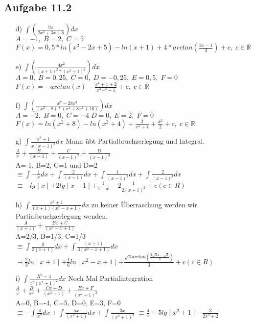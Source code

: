 \documentclass{standalone}
\begin{document}
\subsection{Aufgabe 11.2}
\begin{itemize}
	\item[d)]$\int \left(\frac{9x}{2x^3+3x+5}\right) dx$\\
	$A=-1, \; B=2, \; C=5$\\
	$F(x) =0,5*ln(x^2-2x+5)-ln(x+1)+4*arctan\left(\frac{2x-1}{3}\right)+c, \; c \in \mathbb{R}$
	
	\item[e)]$\int \left(\frac{4x^2}{(x+1)^2*(x^2+1)^2}\right) dx$\\
	$A=0, \; B=0,25, \; C=0, \; D=-0,25, \; E=0,5, \; F=0$\\
	$F(x) =-arctan(x)-\frac{x^2+x+2}{x^3+^2+1}+c, \; c \in \mathbb{R}$
	
	\item[f)]$\int \left(\frac{x^7-28x^3}{(x^2-8)*(x^4+8x^2+16)}\right) dx$\\
	$A=-2, \; B=0, \; C=-4 \; D=0, \; E=2, \; F=0$\\
	$F(x) =ln( x^2+8 )-ln(x^2+4)+\frac{2}{x^2+4}+\frac{x^2}{2}+c, \; c \in \mathbb{R}$
	
	\item[g)]$\int \frac{x^3+1}{x(x-1)^3} dx$ Mann übt Partialbruchzerlegung und Integral.\\
			$\frac{A}{x}+\frac{B}{(x-1)}+\frac{C}{(x-1)^2}+\frac{D}{(x-1)^3}$\\
			A=-1, B=2, C=1 und D=2\\
			$\equiv \int-\frac{1}{x}dx+\int\frac{2}{(x-1)}dx+\int\frac{1}{(x-1)^2}dx+\int\frac{2}{(x-1)^3}dx$
			$\equiv -lg\mid x\mid +2lg\mid x-1\mid+\frac{1}{1-x}-2\frac{1}{2(x+1)^2}+c (c \in R)$\\

	\item[h)]$\int\frac{x^2+1}{(x+1)(x^2-x+1)}dx$ zu keiner Überraschung werden wir Partialbruchzerlegung wenden.\\
			$\frac{A}{(x+1)}+\frac{Bx+C}{(x^2-x+1)}$\\
			A=2/3, B=1/3, C=1/3\\
			$\equiv \int\frac{2}{3(x+1)}dx+\int\frac{(x+1)}{3(x^2-x+1)}dx$
			$\equiv \frac{2}{3}ln\mid x+1\mid+\frac{1}{6}ln\mid x^2-x+1\mid + \frac{\sqrt{3}arctan(\frac{2\sqrt{3}x-\sqrt{3}}{3})}{3}+c (c \in R)$
			
	\item[i)]$\int \frac{X^4-4}{x^2(x^2+1)^2}dx$ Noch Mal Partialintegration\\
		     $ \frac{A}{x}+\frac{B}{x^2}+\frac{Cx+D}{(x^2+1)}+\frac{Ex+F}{(x^2+1)^2}$\\
		     A=0, B=-4, C=5, D=0, E=3, F=0\\
		     $\equiv -\int\frac{4}{x^2}dx +\int \frac{5x}{(x^2+1)}dx + \int \frac{3x}{(x^2+1)^2} $
		     $\equiv \frac{4}{x}-5lg \mid x^2+1\mid-\frac{3}{2x^2+2}$
			 
\end{itemize}
\end{document}
